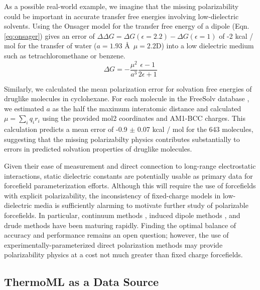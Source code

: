 \documentclass[aps,pre,twocolumn,nofootinbib,superscriptaddress,linenumbers]{revtex4-1}
\begin{document}
As a possible real-world example, we imagine that the missing polarizability could be important in accurate transfer free energies involving low-dielectric solvents.  
Using the Onsager model for the transfer free energy of a dipole (Eqn. \ref{eq:onsager}) gives an error of $\Delta \Delta G = \Delta G(\epsilon=2.2) - \Delta G(\epsilon=1)$ of -2 kcal / mol for the transfer of water ($a = 1.93$ \AA\, $\mu = 2.2$D) into a low dielectric medium such as tetrachloromethane or benzene.  
\begin{equation} \label{eq:onsager}
\Delta G = -\frac{\mu^2}{a^3}\frac{\epsilon - 1}{2 \epsilon + 1}
\end{equation}

Similarly, we calculated the mean polarization error for solvation free energies of druglike molecules in cyclohexane.  For each molecule in the FreeSolv database \cite{freesolv}, we estimated $a$ as the half the maximum interatomic distance and calculated $\mu = \sum_i q_i r_i$ using the provided mol2 coordinates and AM1-BCC charges.  This calculation predicts a mean error of -0.9 $\pm$ 0.07 kcal / mol for the 643 molecules, suggesting that the missing polarizabilty physics contributes substantially to errors in predicted solvation properties of druglike molecules.  

Given their ease of measurement and direct connection to long-range electrostatic interactions, static dielectric constants are potentially usable as primary data for forcefield parameterization efforts.  Although this will require the use of forcefields with explicit polarizability, the inconsistency of fixed-charge models in low-dielectric media is sufficiently alarming to motivate further study of polarizable forcefields.  In particular, continuum methods \cite{truchon2010using, truchon2009integrated, truchon2008accurate}, induced dipole methods \cite{Ponder2010, ren2004temperature}, and drude methods \cite{lamoureux2003modeling, anisimov2005determination} have been maturing rapidly.  Finding the optimal balance of accuracy and performance remains an open question; however, the use of experimentally-parameterized direct polarization methods \cite{wang2013systematic} may provide polarizability physics at a cost not much greater than fixed charge forcefields.


\subsection{ThermoML as a Data Source}
\end{document}
